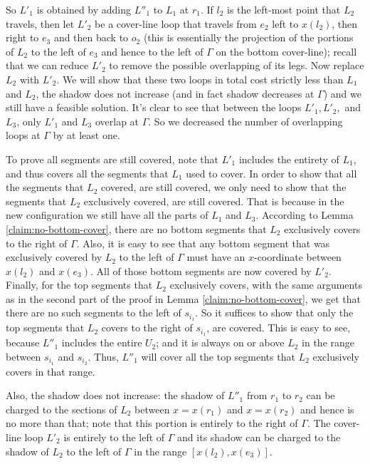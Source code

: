 \documentclass[10pt,a4paper]{amsart}
\theoremstyle{thmstyleone}
\begin{document}
    So $L'_1$ is obtained by adding $L''_1$ to $L_1$ at $r_1$.
    If $l_2$ is the left-most point that $L_2$ travels, then let
    $L'_2$ be a cover-line loop that travels from $e_2$ left to $x(l_2)$, then right to $e_3$ and then back to $o_2$ (this is essentially the projection of the portions of $L_2$ to the left of $e_3$ and hence to the left of $\Gamma$ on the bottom cover-line); recall that we can reduce $L'_2$ to remove the possible overlapping of its legs.     
     Now replace $L_2$ with $L'_2$. We will show that these two loops in total cost strictly less than $L_1$ and $L_2$, the shadow does not increase (and in fact shadow decreases at $\Gamma$) and we still have a feasible solution. It's clear to see that between the loops $L'_1, L'_2,$ and $L_3$, only $L'_1$ and $L_3$ overlap at $\Gamma$. So we decreased the number of overlapping loops at $\Gamma$ by at least one.
    
    To prove all segments are still covered, note that $L'_1$ includes the entirety of $L_1$, and thus covers all the segments that $L_1$ used to cover. In order to show that all the segments that $L_2$ covered, are still covered, we only need to show that the segments that $L_2$ exclusively covered, are still covered. That is because in the new configuration we still have all the parts of $L_1$ and $L_3$.
    According to Lemma \ref{claim:no-bottom-cover}, there are no bottom segments that $L_2$ exclusively covers to the right of $\Gamma$. Also, it is easy to see that any bottom segment that was exclusively covered by $L_2$ to the left of $\Gamma$ must have an $ x $-coordinate between $x(l_2)$ and $x(e_3)$. All of those bottom segments are now covered by $L'_2$.
    Finally, for the top segments that $L_2$ exclusively covers, with the same arguments as in the second part of the proof in Lemma \ref{claim:no-bottom-cover}, we get that there are no such segments to the left of $s_{i_1}$. So it suffices to show that only the top segments that $L_2$ covers to the right of $s_{i_1}$, are covered. This is easy to see, because $L''_1$ includes the entire $U_2$; and it is always on or above $L_2$ in the range between $s_{i_1}$ and $s_{i_2}$. Thus, $L''_1$ will cover all the top segments that $L_2$ exclusively covers in that range.
    
    Also, the shadow does not increase: the shadow of $L''_1$ from $r_1$ to $r_2$ can be charged to the sections
    of $L_2$ between $x=x(r_1)$ and $x=x(r_2)$ and hence is no more than that; note that this portion is entirely to the right of $\Gamma$. The cover-line loop $L'_2$ is entirely to the left of $\Gamma$ and its shadow can be charged to the shadow of $L_2$ to the left of $\Gamma$ in the range $[x(l_2), x(e_3)]$. 
    
\end{document}
